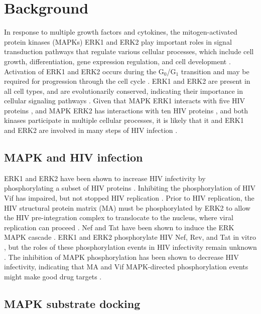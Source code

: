 \section{Background}

In response to multiple growth factors and cytokines, the
mitogen-activated protein kinases (MAPKs) ERK1 and ERK2 play important
roles in signal transduction pathways that regulate various cellular
processes, which include cell growth, differentiation, gene expression
regulation, and cell development
\cite{kolch2005coordinating,blenis1993signal}. Activation of ERK1 and
ERK2 occurs during the G$_0$/G$_1$ transition and may be required for
progression through the cell cycle
\cite{lavoie1996cyclin,roovers2000integrating}. ERK1 and ERK2 are
present in all cell types, and are evolutionarily conserved,
indicating their importance in cellular signaling pathways
\cite{sugden1997regulation,marshall1994map,robbins1994map}. Given that
MAPK ERK1 interacts with five HIV proteins \cite{fu09}, and MAPK ERK2
has interactions with ten HIV proteins \cite{kolch2005coordinating},
and both kinases participate in multiple cellular processes, it is
likely that it and ERK1 and ERK2 are involved in many steps of HIV
infection \cite{ptak08}.

\subsection{MAPK and HIV infection}

ERK1 and ERK2 have been shown to increase HIV infectivity by
phosphorylating a subset of HIV proteins \cite{yang99}. Inhibiting the
phosphorylation of HIV Vif has impaired, but not stopped HIV
replication \cite{yang99, barraud08}. Prior to HIV replication, the
HIV structural protein matrix (MA) must be phosphorylated by ERK2 to
allow the HIV pre-integration complex to translocate to the nucleus,
where viral replication can proceed \cite{bukrinskaya96}. Nef and Tat
have been shown to induce the ERK MAPK cascade
\cite{toschi06,schrager02}. ERK1 and ERK2 phosphorylate HIV Nef, Rev,
and Tat in vitro \cite{yang99}, but the roles of these phosphorylation
events in HIV infectivity remain unknown \cite{yang98}. The inhibition
of MAPK phosphorylation has been shown to decrease HIV infectivity,
indicating that MA and Vif MAPK-directed phosphorylation events might
make good drug targets \cite{yang99,bukrinskaya96}.

\subsection{MAPK substrate docking} 


